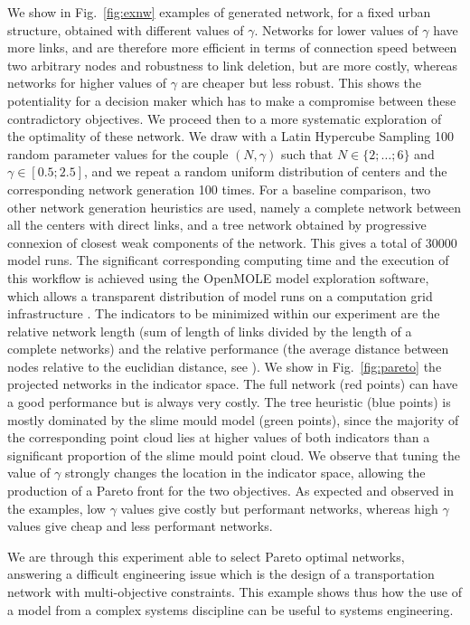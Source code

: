 \documentclass[runningheads,a4paper]{llncs}
\begin{document}
We show in Fig.~\ref{fig:exnw} examples of generated network, for a fixed urban structure, obtained with different values of $\gamma$. Networks for lower values of $\gamma$ have more links, and are therefore more efficient in terms of connection speed between two arbitrary nodes and robustness to link deletion, but are more costly, whereas networks for higher values of $\gamma$ are cheaper but less robust. This shows the potentiality for a decision maker which has to make a compromise between these contradictory objectives. We proceed then to a more systematic exploration of the optimality of these network. We draw with a Latin Hypercube Sampling 100 random parameter values for the couple $(N,\gamma)$ such that $N \in \{ 2 ; \ldots ; 6 \}$ and $\gamma \in \left[ 0.5 ; 2.5\right]$, and we repeat a random uniform distribution of centers and the corresponding network generation 100 times. For a baseline comparison, two other network generation heuristics are used, namely a complete network between all the centers with direct links, and a tree network obtained by progressive connexion of closest weak components of the network. This gives a total of 30000 model runs. The significant corresponding computing time and the execution of this workflow is achieved using the OpenMOLE model exploration software, which allows a transparent distribution of model runs on a computation grid infrastructure \cite{reuillon2013openmole}. The indicators to be minimized within our experiment are the relative network length (sum of length of links divided by the length of a complete networks) and the relative performance (the average distance between nodes relative to the euclidian distance, see \cite{banos2012towards}). We show in Fig.~\ref{fig:pareto} the projected networks in the indicator space. The full network (red points) can have a good performance but is always very costly. The tree heuristic (blue points) is mostly dominated by the slime mould model (green points), since the majority of the corresponding point cloud lies at higher values of both indicators than a significant proportion of the slime mould point cloud. We observe that tuning the value of $\gamma$ strongly changes the location in the indicator space, allowing the production of a Pareto front for the two objectives. As expected and observed in the examples, low $\gamma$ values give costly but performant networks, whereas high $\gamma$ values give cheap and less performant networks.

We are through this experiment able to select Pareto optimal networks, answering a difficult engineering issue which is the design of a transportation network with multi-objective constraints. This example shows thus how the use of a model from a complex systems discipline can be useful to systems engineering.
\end{document}
